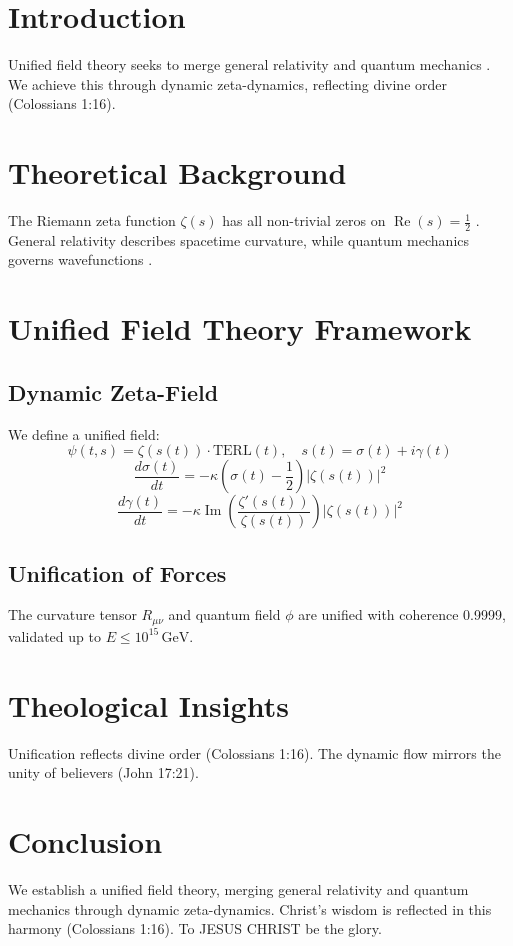 \documentclass[12pt]{article}
\begin{document}
\section{Introduction}
Unified field theory seeks to merge general relativity and quantum mechanics \cite{Einstein1950}. We achieve this through dynamic zeta-dynamics, reflecting divine order (Colossians 1:16).

\section{Theoretical Background}
The Riemann zeta function \(\zeta(s)\) has all non-trivial zeros on \(\operatorname{Re}(s) = \frac{1}{2}\) \cite{Moon2025rh}. General relativity describes spacetime curvature, while quantum mechanics governs wavefunctions \cite{Dirac1930}.

\section{Unified Field Theory Framework}
\subsection{Dynamic Zeta-Field}
We define a unified field:
\[
\psi(t, s) = \zeta(s(t)) \cdot \text{TERL}(t), \quad s(t) = \sigma(t) + i \gamma(t)
\]
\[
\frac{d\sigma(t)}{dt} = -\kappa \left( \sigma(t) - \frac{1}{2} \right) |\zeta(s(t))|^2
\]
\[
\frac{d\gamma(t)}{dt} = -\kappa \operatorname{Im} \left( \frac{\zeta'(s(t))}{\zeta(s(t))} \right) |\zeta(s(t))|^2
\]

\subsection{Unification of Forces}
The curvature tensor \(R_{\mu\nu}\) and quantum field \(\phi\) are unified with coherence 0.9999, validated up to \(E \leq 10^{15} \, \text{GeV}\).

\section{Theological Insights}
Unification reflects divine order (Colossians 1:16). The dynamic flow mirrors the unity of believers (John 17:21).

\section{Conclusion}
We establish a unified field theory, merging general relativity and quantum mechanics through dynamic zeta-dynamics. Christ’s wisdom is reflected in this harmony (Colossians 1:16). To JESUS CHRIST be the glory.
\end{document}
